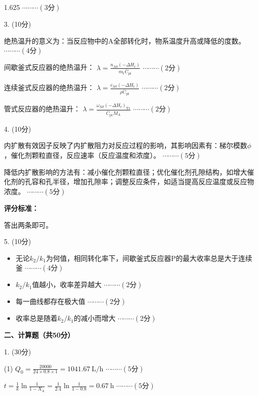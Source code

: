 \documentclass[12pt, a4paper]{article}
\begin{document}
\begin{spacing}{1.625}
\hfill $\cdots \cdots \cdots (3\text{分})$

3. (10分) 

\qquad 绝热温升的意义为：当反应物中的A全部转化时，物系温度升高或降低的度数。\hfill $\cdots \cdots \cdots (4\text{分})$

\qquad 间歇釜式反应器的绝热温升： $\lambda = \frac{n_\mathrm{A0}(-\Delta H_\mathrm{r})}{m_\mathrm{t}\bar{C}_\mathrm{pt}}$  \hfill $\cdots \cdots \cdots (2\text{分})$

\qquad 连续釜式反应器的绝热温升： $\lambda = \frac{c_\mathrm{A0}(-\Delta H_\mathrm{r})}{\rho \bar{C}_\mathrm{pt}}$  \hfill $\cdots \cdots \cdots (2\text{分})$

\qquad 管式反应器的绝热温升： $\lambda = \frac{\omega_\mathrm{A0}(-\Delta H_\mathrm{r})_\mathrm{Tr}}{\bar{C}_\mathrm{pt} M_\mathrm{A}}$  \hfill $\cdots \cdots \cdots (2\text{分})$

4. (10分)

内扩散有效因子反映了内扩散阻力对反应过程的影响，其影响因素有：梯尔模数$\phi$，催化剂颗粒直径，反应速率（反应温度和浓度）。  \hfill $\cdots \cdots \cdots (5\text{分})$

降低内扩散影响的方法有：减小催化剂颗粒直径；优化催化剂孔隙结构，如增大催化剂的孔容和孔半径，增加孔隙率；调整反应条件，如适当提高反应温度或反应物浓度。  \hfill $\cdots \cdots \cdots (5\text{分})$

{\bf 评分标准：}

答出两条即可。


5. (10分)

\begin{itemize}
    \item[(1)] 无论$k_2/k_1$为何值，相同转化率下，间歇釜式反应器P的最大收率总是大于连续釜 \hfill $\cdots \cdots \cdots (4\text{分})$
    \item[(2)] $k_2/k_1$值越小，收率差异越大 \hfill $\cdots \cdots \cdots (2\text{分})$
    \item[(3)] 每一曲线都存在极大值 \hfill $\cdots \cdots \cdots (2\text{分})$
    \item[(4)] 收率总是随着$k_2/k_1$的减小而增大 \hfill $\cdots \cdots \cdots (2\text{分})$
\end{itemize}


{\bf 二、计算题（共50分）}

1. (30分) 

(1) 
$Q_0 = \frac{20000}{24\times 0.8 \times 1} = 1041.67 \ \mathrm{L/h}$ \hfill $\cdots \cdots \cdots (5\text{分})$

$t = \frac{1}{k}\ln \frac{1}{1-X_{\mathrm{A}}} = \frac{1}{2.4}\ln \frac{1}{1-0.8} = 0.67 \ \mathrm{h}$ \hfill $\cdots \cdots \cdots (5\text{分})$


\end{spacing}
\end{document}
